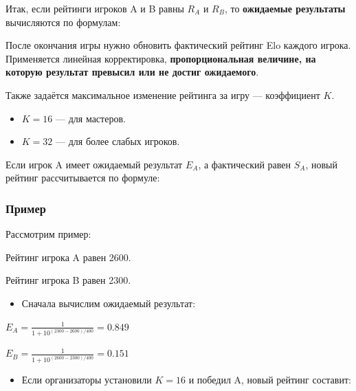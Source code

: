 \documentclass[11pt,a4paper]{article}
\begin{document}
Итак, если рейтинги игроков A и B равны $R_A$ и $R_B$, то \textbf{ожидаемые результаты} вычисляются по формулам:


После окончания игры нужно обновить фактический рейтинг Elo каждого игрока. Применяется линейная корректировка, \textbf{пропорциональная величине, на которую результат превысил или не достиг ожидаемого}.

Также задаётся максимальное изменение рейтинга за игру --- коэффициент $K$.

\begin{itemize}
\tightlist
\item
  $K=16$ --- для мастеров.
\item
  $K=32$ --- для более слабых игроков.
\end{itemize}

Если игрок A имеет ожидаемый результат $E_A$, а фактический равен $S_A$, новый рейтинг рассчитывается по формуле:


\subsubsection{Пример}\label{example}

Рассмотрим пример:

Рейтинг игрока A равен 2600.

Рейтинг игрока B равен 2300.

\begin{itemize}
\tightlist
\item
  Сначала вычислим ожидаемый результат:
\end{itemize}

\(E_{A} = \frac{1}{1+10^{(2300-2600)/400}} = 0.849\)

\(E_{B} = \frac{1}{1+10^{(2600-2300)/400}} = 0.151\)

\begin{itemize}
\tightlist
\item
  Если организаторы установили $K=16$ и победил A, новый рейтинг составит:
\end{itemize}
\end{document}
